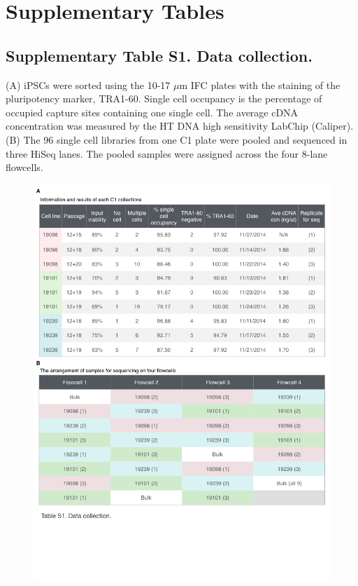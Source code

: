\clearpage
\section{Supplementary Tables}\label{supplementary-tables}

\subsection{Supplementary Table S1. Data
collection.}\label{supplementary-table-s1.-data-collection.}

(A) iPSCs were sorted using the 10-17 $\mu$m IFC plates with the
staining of the pluripotency marker, TRA1-60. Single cell occupancy is
the percentage of occupied capture sites containing one single cell. The
average cDNA concentration was measured by the HT DNA high sensitivity
LabChip (Caliper). (B) The 96 single cell libraries from one C1 plate
were pooled and sequenced in three HiSeq lanes. The pooled samples were
assigned across the four 8-lane flowcells.

\begin{figure}[htbp]
\centering
\includegraphics[trim=0 2.5in 0 0,clip,width=5in]{img/ch04/Figure16.jpeg}
\end{figure}
\clearpage

